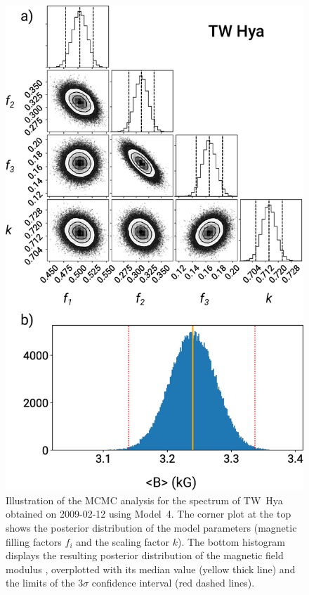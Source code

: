 \documentclass{aa}
\begin{document}
\begin{figure}
\centering
\includegraphics[width=0.9\columnwidth]{twhya.eps}
\caption{
    Illustration of the MCMC analysis for the spectrum of TW~Hya obtained on 2009-02-12 using Model~4. The corner plot at the top shows the posterior distribution of the model parameters (magnetic filling factors $f_i$ and the scaling factor $k$). The bottom histogram displays the resulting posterior distribution of the magnetic field modulus {\bb}, overplotted with its median value (yellow thick line) and the limits of the $3\sigma$ confidence interval (red dashed lines).
}
\label{figure:mcmc}
\end{figure}

\end{document}
